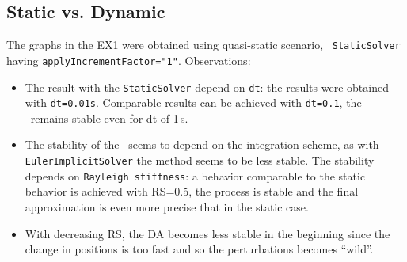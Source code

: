 \documentclass[10pt]{article}
\begin{document}
\subsection{Static vs. Dynamic}
The graphs in the EX1 were obtained using quasi-static scenario, \ie\ \texttt{StaticSolver} having \texttt{applyIncrementFactor="1"}. Observations:
\begin{itemize}
 \item The result with the \texttt{StaticSolver} depend on \texttt{dt}: the results were obtained with \texttt{dt=0.01s}. Comparable results can be
achieved with \texttt{dt=0.1}, 
 the \ssda\ remains stable even for dt of 1\,s.
 \item The stability of the \ssda\ seems to depend on the integration scheme, as with \texttt{EulerImplicitSolver} the method seems to be less stable.
The stability depends on \texttt{Rayleigh stiffness}: a behavior comparable to the static behavior is achieved with RS=0.5, the process is stable and
the final approximation is even more precise that in the static case. 
\item With decreasing RS, the DA becomes less stable in the beginning since the change in positions is too fast and so the perturbations becomes
``wild''. 
\end{itemize}




\end{document}

